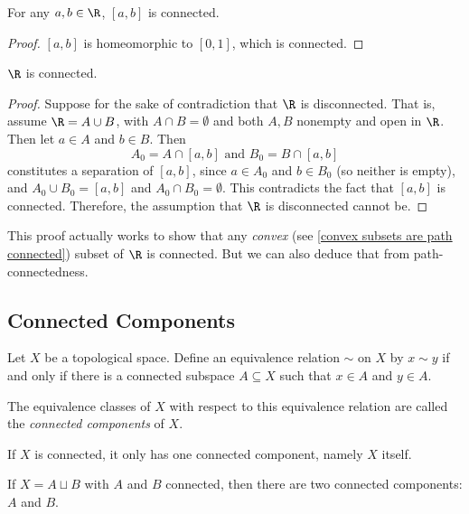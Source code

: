 \documentclass[noname]{notes}
\begin{document}
\begin{corollary}
	For any $a, b \in \R$, $[a,b]$ is connected. 
\end{corollary}

\begin{proof}
	$[a,b]$ is homeomorphic to $[0,1]$, which is connected. 
\end{proof}

\begin{corollary}
	$\R$ is connected. 
\end{corollary}

\begin{proof}
	Suppose for the sake of contradiction that $\R$ is disconnected. That is, assume $\R = A \cup B$, with $A \cap B = \emptyset$ and both $A, B$ nonempty and open in $\R$. Then let $a \in A$ and $b \in B$. Then 
	\[
		A_0 = A \cap [a,b] \text{ and } B_0 = B \cap [a,b]
	\]
	constitutes a separation of $[a,b]$, since $a \in A_0$ and $b \in B_0$ (so neither is empty), and $A_0 \cup B_0 = [a,b]$ and $A_0 \cap B_0 = \emptyset$. This contradicts the fact that $[a,b]$ is connected. Therefore, the assumption that $\R$ is disconnected cannot be. 
\end{proof}

\begin{remark}
	This proof actually works to show that any \emph{convex} (see \cref{convex subsets are path connected}) subset of $\R$ is connected. But we can also deduce that from path-connectedness. 
\end{remark}

\subsection{Connected Components}

Let $X$ be a topological space. Define an equivalence relation $\sim$ on $X$ by $x \sim y$ if and only if there is a connected subspace $A \subseteq X$ such that $x \in A$ and $y \in A$. 

\begin{definition}
	The equivalence classes of $X$ with respect to this equivalence relation are called the \emph{connected components} of $X$. 
\end{definition}

\begin{example}
	If $X$ is connected, it only has one connected component, namely $X$ itself. 
\end{example}

\begin{example}
	If $X = A \sqcup B$ with $A$ and $B$ connected, then there are two connected components: $A$ and $B$. 
\end{example}
\end{document}
